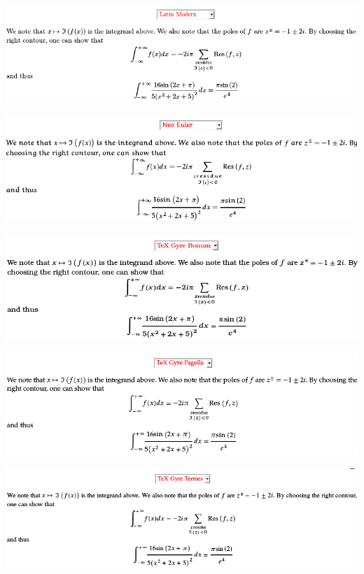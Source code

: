 \includegraphics[width=\textwidth]{screenshots/4-mathml-fonts-latin-modern}

\includegraphics[width=\textwidth]{screenshots/4-mathml-fonts-neo-euler}

\includegraphics[width=\textwidth]{screenshots/4-mathml-fonts-tex-gyre-bonum}

\includegraphics[width=\textwidth]{screenshots/4-mathml-fonts-tex-gyre-pagella}

\includegraphics[width=\textwidth]{screenshots/4-mathml-fonts-tex-gyre-termes}

